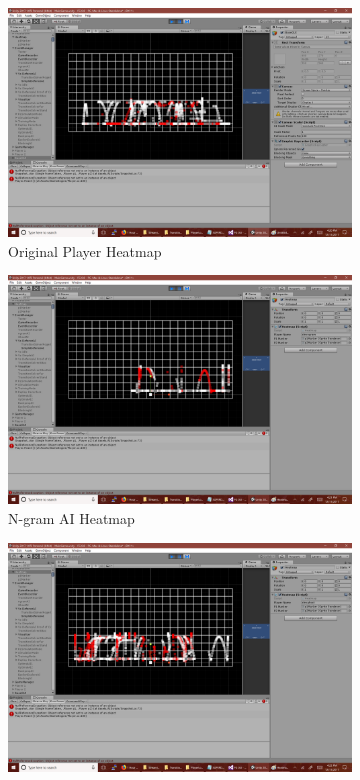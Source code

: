 \begin{figure}[h]
	\centering
	\begin{subfigure}[h]{0.4\textwidth}
		\centering
		\includegraphics[width=\textwidth]{Figures/HeatmapOrig.png}
		\caption{Original Player Heatmap}
		\label{}
	\end{subfigure}
	\begin{subfigure}[h]{0.4\textwidth}
		\centering
		\includegraphics[width=\textwidth]{Figures/HeatmapNgram.png}
		\caption{N-gram AI Heatmap}
		\label{}
	\end{subfigure}
	\begin{subfigure}[h]{0.4\textwidth}
		\centering
		\includegraphics[width=\textwidth]{Figures/HeatmapGhost.png}

\end{subfigure}
\end{figure}
